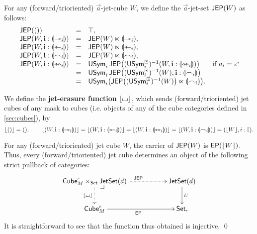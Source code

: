 \documentclass[a4paper]{article}
\begin{document}
\begin{definition} \label{def:jep}
	For any (forward/trioriented) $\vec a$-jet-cube $W$, we define the $\vec a$-jet-set $\mathsf{JEP}(W)$ as follows:
	\[ \begin{array}{l c l l}
		\JEP(()) &=& \top, \\
		\JEP(W, \dm i : \rival{\jet_i}) &=& \JEP(W) \multip \rival{\jet_i}, \\
		\JEP(W, \dm i : \rival{\tej_i}) &=& \JEP(W) \multip \rival{\tej_i}, \\
		\JEP(W, \dm i : \rival{\edge_i}) &=& \JEP(W) \multip \rival{\edge_i}, \\
		\JEP(W, \dm i : \rival{\equijet_i}) &=& \Usym_i \, \JEP\paren{(\Usymcube_i)\inv(W, \dm i : \rival{\equijet_i})}
		& \text{if $a_i = \ypolar$} \\
		&=& \Usym_i \, \JEP\paren{(\Usymcube_i)\inv(W), \dm i : \rival{\edge_i}} \\
		&=& \Usym_i\paren{\JEP\paren{(\Usymcube_i)\inv(W)} \multip \rival{\edge_i}}.
	\end{array} \]
\end{definition}
\begin{definition} \label{def:jet-cube-erasure}
	We define the \textbf{jet-erasure function} $\mathopen{}\left\lfloor {\llcorner\hspace{-.4ex}\lrcorner} \right\rfloor\mathclose{}$, which sends (forward/trioriented) jet cubes of any mask to cubes (i.e. objects of any of the cube categories defined in \cref{sec:cubes}), by
	\[
		\mathopen{}\left\lfloor () \right\rfloor\mathclose{} = (),
		\qquad
		\mathopen{}\left\lfloor (W, \mathbf{i} : {\llparenthesis \rightarrowtriangle_i \rrparenthesis}) \right\rfloor\mathclose{} =
		\mathopen{}\left\lfloor (W, \mathbf{i} : {\llparenthesis \leftarrowtriangle_i \rrparenthesis}) \right\rfloor\mathclose{} =
		\mathopen{}\left\lfloor (W, \mathbf{i} : {\llparenthesis \leftrightarrowtriangle_i \rrparenthesis}) \right\rfloor\mathclose{} =
		\mathopen{}\left\lfloor (W, \mathbf{i} : {\llparenthesis \frown_i \rrparenthesis}) \right\rfloor\mathclose{} =
		(\mathopen{}\left\lfloor W \right\rfloor\mathclose{}, i : {\mathbb I}).
	\]
\end{definition}
\begin{corollary} \label{thm:jet-cube-pullback}
	For any (forward/trioriented) jet cube $W$, the carrier of $\mathsf{JEP}(W)$ is $\mathsf{EP}(\mathopen{}\left\lfloor W \right\rfloor\mathclose{})$.
	Thus, every (forward/trioriented) jet cube determines an object of the following strict pullback of categories:
	\[
			\xymatrix{
				\cubecat^\eps_M \times_\Set \jetset{\vec a}
					\ar@{.>}[rr]^{\JEP}
					\ar@{.>}[d]_{\erasejc{\loch}}
					\xydrcorner
				&&
				\jetset{\vec a}
					\ar[d]^U
				\\
				\cubecat^\eps_M
					\ar[rr]_{\EP}
				&&
				\Set,
			}
	\]
	It is straightforward to see that the function thus obtained is injective. \qed
\end{corollary}
\end{document}
